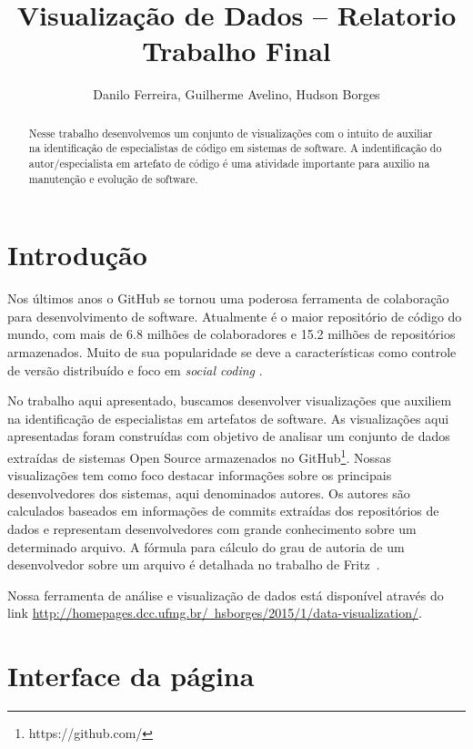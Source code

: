 \documentclass[12pt]{article}
\title{Visualização de Dados -- Relatorio Trabalho Final}
\author{Danilo Ferreira, Guilherme Avelino, Hudson Borges}
\begin{document}
\maketitle

\begin{abstract}
Nesse trabalho desenvolvemos um conjunto de visualizações com o intuito de auxiliar na identificação de especialistas de código em sistemas de software. A indentificação do autor/especialista em artefato de código é uma atividade importante   para auxilio na manutenção e evolução de software.\\
\end{abstract}


\section{Introdução}

Nos últimos anos o GitHub se tornou uma poderosa ferramenta de colaboração para desenvolvimento de software. Atualmente é o maior repositório de código do mundo, com mais de 6.8 milhões de colaboradores e 15.2 milhões de repositórios armazenados. Muito de sua popularidade se deve a características como controle de versão distribuído e foco em \textit{social coding} \cite{Dabbish2012}. 

No trabalho aqui apresentado, buscamos desenvolver visualizações que auxiliem na identificação de especialistas em artefatos de software. As visualizações aqui apresentadas foram construídas com objetivo de analisar um conjunto de dados extraídas de sistemas Open Source armazenados no GitHub\footnote{https://github.com/}. Nossas visualizações tem como foco destacar informações sobre os principais desenvolvedores dos sistemas, aqui denominados autores. Os autores são calculados baseados em informações de commits extraídas dos repositórios de dados e representam desenvolvedores com grande conhecimento sobre um determinado arquivo. A fórmula para cálculo do grau de autoria de um desenvolvedor sobre um arquivo é detalhada no trabalho de Fritz~\cite{Fritz2014}.

Nossa ferramenta de análise e visualização de dados está disponível através do link \href{http://homepages.dcc.ufmg.br/~hsborges/2015/1/data-visualization/}{http://homepages.dcc.ufmg.br/~hsborges/2015/1/data-visualization/}.

\section{Interface da página}
\end{document}
